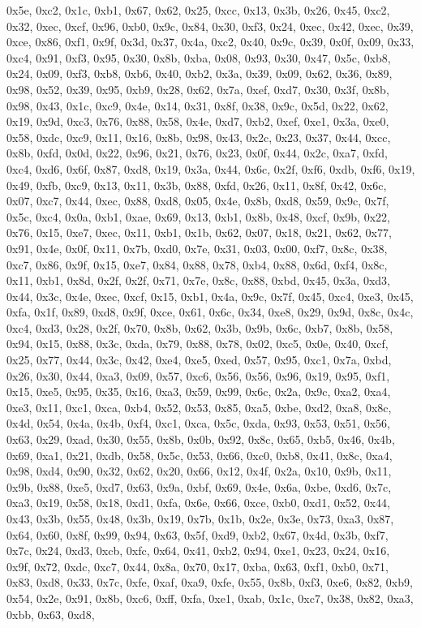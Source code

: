 \documentclass[
]{book}
\begin{document}
0x5e, 0xc2, 0x1c, 0xb1, 0x67, 0x62, 0x25, 0xcc, 0x13, 0x3b, 0x26, 0x45, 0xc2, 0x32, 0xec, 0xcf, 0x96, 0xb0, 0x9c, 0x84, 0x30, 0xf3, 0x24, 0xec, 0x42, 0xec, 0x39, 0xce, 0x86, 0xf1, 0x9f, 0x3d, 0x37, 0x4a, 0xc2, 0x40, 0x9c, 0x39, 0x0f, 0x09, 0x33, 0xc4, 0x91, 0xf3, 0x95, 0x30, 0x8b, 0xba, 0x08, 0x93, 0x30, 0x47, 0x5c, 0xb8, 0x24, 0x09, 0xf3, 0xb8, 0xb6, 0x40, 0xb2, 0x3a, 0x39, 0x09, 0x62, 0x36, 0x89, 0x98, 0x52, 0x39, 0x95, 0xb9, 0x28, 0x62, 0x7a, 0xef, 0xd7, 0x30, 0x3f, 0x8b, 0x98, 0x43, 0x1c, 0xc9,
0x4e, 0x14, 0x31, 0x8f, 0x38, 0x9c, 0x5d, 0x22, 0x62, 0x19, 0x9d, 0xc3, 0x76, 0x88, 0x58, 0x4e, 0xd7, 0xb2, 0xef, 0xe1, 0x3a, 0xe0, 0x58, 0xdc, 0xc9, 0x11, 0x16, 0x8b, 0x98, 0x43, 0x2c, 0x23, 0x37, 0x44, 0xcc, 0x8b, 0xfd, 0x0d, 0x22, 0x96, 0x21, 0x76, 0x23, 0x0f, 0x44, 0x2c, 0xa7, 0xfd, 0xc4, 0xd6, 0x6f, 0x87, 0xd8, 0x19, 0x3a, 0x44, 0x6c, 0x2f, 0xf6, 0xdb, 0xf6, 0x19, 0x49, 0xfb, 0xc9, 0x13, 0x11, 0x3b, 0x88, 0xfd, 0x26, 0x11, 0x8f, 0x42, 0x6c, 0x07, 0xc7, 0x44, 0xec, 0x88, 0xd8, 0x05, 0x4e, 0x8b,
0xd8, 0x59, 0x9c, 0x7f, 0x5c, 0xc4, 0x0a, 0xb1, 0xae, 0x69, 0x13, 0xb1, 0x8b, 0x48, 0xcf, 0x9b, 0x22, 0x76, 0x15, 0xe7, 0xec, 0x11, 0xb1, 0x1b, 0x62, 0x07, 0x18, 0x21, 0x62, 0x77, 0x91, 0x4e, 0x0f, 0x11, 0x7b, 0xd0, 0x7e, 0x31, 0x03, 0x00, 0xf7, 0x8c, 0x38, 0xc7, 0x86, 0x9f, 0x15, 0xe7, 0x84, 0x88, 0x78, 0xb4, 0x88, 0x6d, 0xf4, 0x8c, 0x11, 0xb1, 0x8d, 0x2f, 0x2f, 0x71, 0x7e, 0x8c, 0x88, 0xbd, 0x45, 0x3a, 0xd3, 0x44, 0x3c, 0x4e, 0xec, 0xcf, 0x15, 0xb1, 0x4a, 0x9c, 0x7f, 0x45, 0xc4, 0xe3, 0x45, 0xfa,
0x1f, 0x89, 0xd8, 0x9f, 0xce, 0x61, 0x6c, 0x34, 0xe8, 0x29, 0x9d, 0x8c, 0x4c, 0xc4, 0xd3, 0x28, 0x2f, 0x70, 0x8b, 0x62, 0x3b, 0x9b, 0x6c, 0xb7, 0x8b, 0x58, 0x94, 0x15, 0x88, 0x3c, 0xda, 0x79, 0x88, 0x78, 0x02, 0xc5, 0x0e, 0x40, 0xcf, 0x25, 0x77, 0x44, 0x3c, 0x42, 0xe4, 0xe5, 0xed, 0x57, 0x95, 0xc1, 0x7a, 0xbd, 0x26, 0x30, 0x44, 0xa3, 0x09, 0x57, 0xc6, 0x56, 0x56, 0x96, 0x19, 0x95, 0xf1, 0x15, 0xe5, 0x95, 0x35, 0x16, 0xa3, 0x59, 0x99, 0x6c, 0x2a, 0x9c, 0xa2, 0xa4, 0xe3, 0x11, 0xc1, 0xca, 0xb4, 0x52,
0x53, 0x85, 0xa5, 0xbe, 0xd2, 0xa8, 0x8c, 0x4d, 0x54, 0x4a, 0x4b, 0xf4, 0xc1, 0xca, 0x5c, 0xda, 0x93, 0x53, 0x51, 0x56, 0x63, 0x29, 0xad, 0x30, 0x55, 0x8b, 0x0b, 0x92, 0x8c, 0x65, 0xb5, 0x46, 0x4b, 0x69, 0xa1, 0x21, 0xdb, 0x58, 0x5c, 0x53, 0x66, 0xc0, 0xb8, 0x41, 0x8c, 0xa4, 0x98, 0xd4, 0x90, 0x32, 0x62, 0x20, 0x66, 0x12, 0x4f, 0x2a, 0x10, 0x9b, 0x11, 0x9b, 0x88, 0xe5, 0xd7, 0x63, 0x9a, 0xbf, 0x69, 0x4e, 0x6a, 0xbe, 0xd6, 0x7c, 0xa3, 0x19, 0x58, 0x18, 0xd1, 0xfa, 0x6e, 0x66, 0xce, 0xb0, 0xd1, 0x52,
0x44, 0x43, 0x3b, 0x55, 0x48, 0x3b, 0x19, 0x7b, 0x1b, 0x2e, 0x3e, 0x73, 0xa3, 0x87, 0x64, 0x60, 0x8f, 0x99, 0x94, 0x63, 0x5f, 0xd9, 0xb2, 0x67, 0x4d, 0x3b, 0xf7, 0x7c, 0x24, 0xd3, 0xcb, 0xfc, 0x64, 0x41, 0xb2, 0x94, 0xe1, 0x23, 0x24, 0x16, 0x9f, 0x72, 0xdc, 0xc7, 0x44, 0x8a, 0x70, 0x17, 0xba, 0x63, 0xf1, 0xb0, 0x71, 0x83, 0xd8, 0x33, 0x7c, 0xfe, 0xaf, 0xa9, 0xfe, 0x55, 0x8b, 0xf3, 0xe6, 0x82, 0xb9, 0x54, 0x2e, 0x91, 0x8b, 0xc6, 0xff, 0xfa, 0xe1, 0xab, 0x1c, 0xc7, 0x38, 0x82, 0xa3, 0xbb, 0x63, 0xd8,
\end{document}
